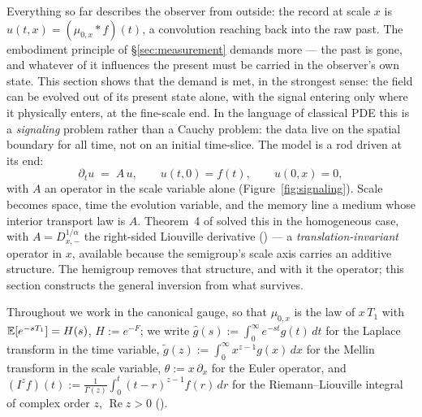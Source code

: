 Everything so far describes the observer from outside: the record at scale $x$ is
$u(t, x) = (\mu_{0,x} * f)(t)$, a convolution reaching back into the raw past. The
embodiment principle of \S\ref{sec:measurement} demands more --- the past is gone, and
whatever of it influences the present must be carried in the observer's own state. This
section shows that the demand is met, in the strongest sense: the field can be evolved
out of its present state alone, with the signal entering only where it physically
enters, at the fine-scale end. In the language of classical PDE this is a
\emph{signaling} problem rather than a Cauchy problem: the data live on the spatial
boundary for all time, not on an initial time-slice. The model is a rod driven at
its end:
\[
  \partial_t u \;=\; A\,u, \qquad u(t, 0) = f(t), \qquad u(0, x) = 0,
\]
with $A$ an operator in the scale variable alone (Figure~\ref{fig:signaling}). Scale
becomes space, time the evolution variable, and the memory line a medium whose interior
transport law is $A$. Theorem~4 of  solved this in the
homogeneous case, with $A = D^{1/\alpha}_{x,-}$ the right-sided Liouville derivative
() --- a \emph{translation-invariant} operator in $x$,
available because the semigroup's scale axis carries an additive structure. The
hemigroup removes that structure, and with it the operator; this section constructs the
general inversion from what survives.



Throughout we work in the canonical gauge, so that $\mu_{0,x}$ is the law of $x\,T_1$ with
$\mathbb{E}[e^{-sT_1}] = H(s)$, $H := e^{-F}$; we write $\hat g(s) := \int_0^\infty e^{-st}g(t)\,dt$
for the Laplace transform in the time variable,
$\tilde g(z) := \int_0^\infty x^{z-1} g(x)\,dx$ for the Mellin transform in the scale
variable, $\theta := x\,\partial_x$ for the Euler operator, and
$(I^z f)(t) := \tfrac{1}{\Gamma(z)}\int_0^t (t-r)^{z-1} f(r)\,dr$ for the Riemann--Liouville
integral of complex order $z$, $\operatorname{Re} z > 0$ ().

